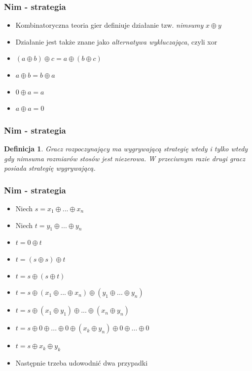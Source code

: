 \documentclass[polish,envcountsect,10pt]{beamer}
\newtheorem{mdfn}{Definicja}
\begin{document}
                \begin{frame}
                    \frametitle{Nim - strategia}
                        \begin{itemize}
                            \item<1->Kombinatoryczna teoria gier definiuje działanie tzw. \textit{nimsumy} $x \oplus y$
                            \item<2-> Działanie jest także znane jako \textit{alternatywa wykluczająca}, czyli xor
                            \item<3-> $(a \oplus b) \oplus c = a \oplus (b \oplus c)$
                            \item<4-> $a \oplus b = b \oplus a$
                            \item<5-> $0 \oplus a = a$
                            \item<6-> $a \oplus a = 0$
                        \end{itemize}
                \end{frame}
                \begin{frame}
                    \frametitle{Nim - strategia}
                        \begin{mdfn}
                            Gracz rozpoczynający ma wygrywającą strategię wtedy i tylko wtedy gdy nimsuma rozmiarów stosów jest niezerowa. W przeciwnym razie drugi gracz posiada strategię wygrywającą.
                        \end{mdfn} 
                \end{frame}
                \begin{frame}
                    \frametitle{Nim - strategia}
                    \begin{itemize}
                        \item<1-> Niech $s = x_1 \oplus ... \oplus x_n$
                        \item<2-> Niech $t = y_1 \oplus ... \oplus y_n$
                        \item<3-> $t = 0 \oplus t $ 
                        \item<4-> $t = (s \oplus s) \oplus t$
                        \item<5-> $t = s \oplus (s \oplus t)$
                        \item<6-> $t = s \oplus (x_1 \oplus ... \oplus x_n) \oplus (y_1 \oplus ... \oplus y_n)$
                        \item<7-> $t = s \oplus (x_1 \oplus y_1) \oplus ... \oplus (x_n \oplus y_n) $
                        \item<8-> $t = s \oplus 0 \oplus ... \oplus 0 \oplus (x_k \oplus y_n) \oplus 0 \oplus ... \oplus 0$
                        \item<9-> $t = s \oplus x_k \oplus y_k$
                        \item<10-> Następnie trzeba udowodnić dwa przypadki
                    \end{itemize}
                \end{frame}
\end{document}
